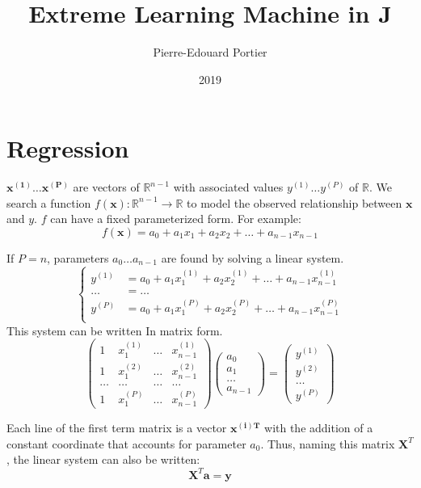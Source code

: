\documentclass[10pt]{article}%
\title{Extreme Learning Machine in J}
\author{Pierre-Edouard Portier}
\date{2019}
\renewcommand{\vec}[1]{\boldsymbol{#1}}
\begin{document}
\maketitle
\section{Regression}
$\vec{x^{(1)}}\dots\vec{x^{(P)}}$ are vectors of $\mathbb{R}^{n-1}$ with
associated values $y^{(1)}\dots y^{(P)}$ of $\mathbb{R}$.
We search a function $f(\vec{x}):\mathbb{R}^{n-1} \rightarrow \mathbb{R}$ to
model the observed relationship between $\vec{x}$ and $y$.
$f$ can have a fixed parameterized form. For example:
\[
f(\vec{x}) = a_0 + a_1 x_1 + a_2 x_2 + \dots + a_{n-1} x_{n-1}
\]

If $P=n$, parameters $a_0 \dots a_{n-1}$ are found by solving a linear system.
\[
\begin{cases}
y^{(1)} &= a_0 + a_1 x_1^{(1)} + a_2 x_2^{(1)} + \dots + a_{n-1} x_{n-1}^{(1)} \\
\dots &= \dots \\
y^{(P)} &= a_0 + a_1 x_1^{(P)} + a_2 x_2^{(P)} + \dots + a_{n-1} x_{n-1}^{(P)} \\
\end{cases}
\]
This system can be written In matrix form.
\[
\left( \begin{array}{cccc}
1 & x^{(1)}_1 & \dots & x^{(1)}_{n-1} \\
1 & x^{(2)}_1 & \dots & x^{(2)}_{n-1} \\
\dots & \dots & \dots & \dots \\
1 & x^{(P)}_1 & \dots & x^{(P)}_{n-1}
\end{array} \right)
\left( \begin{array}{c}
a_0 \\ a_1 \\ \dots \\ a_{n-1} 
\end{array} \right)
=
\left( \begin{array}{c}
y^{(1)} \\ y^{(2)} \\ \dots \\ y^{(P)} 
\end{array} \right)
\]

Each line of the first term matrix is a vector $\vec{x^{(i)T}}$ with the
addition of a constant coordinate that accounts for parameter $a_0$.
Thus, naming this matrix $\vec{X}^T$, the linear system can also be written:
\[
\vec{X}^T \vec{a} = \vec{y}
\]
\end{document}
